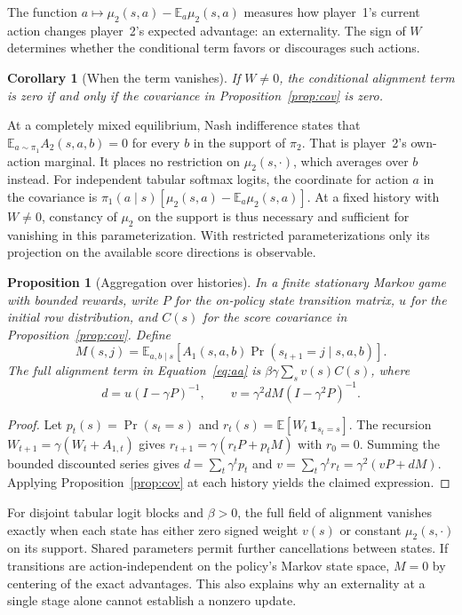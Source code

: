 \documentclass[11pt]{article}
\newtheorem{proposition}{Proposition}
\newtheorem{corollary}{Corollary}
\theoremstyle{remark}
\newcommand{\E}{\mathbb{E}}
\begin{document}
The function $a\mapsto\mu_2(s,a)-\E_a\mu_2(s,a)$ measures how player~1's current action changes player~2's expected advantage: an externality. The sign of $W$ determines whether the conditional term favors or discourages such actions.

\begin{corollary}[When the term vanishes]\label{cor:iff}
If $W\neq 0$, the conditional alignment term is zero if and only if the covariance in Proposition~\ref{prop:cov} is zero.
\end{corollary}

At a completely mixed equilibrium, Nash indifference states that $\E_{a\sim\pi_1}A_2(s,a,b)=0$ for every $b$ in the support of $\pi_2$. That is player~2's own-action marginal. It places no restriction on $\mu_2(s,\cdot)$, which averages over $b$ instead. For independent tabular softmax logits, the coordinate for action $a$ in the covariance is $\pi_1(a\mid s)[\mu_2(s,a)-\E_a\mu_2(s,a)]$. At a fixed history with $W\ne0$, constancy of $\mu_2$ on the support is thus necessary and sufficient for vanishing in this parameterization. With restricted parameterizations only its projection on the available score directions is observable.

\begin{proposition}[Aggregation over histories]\label{prop:aggregate}
In a finite stationary Markov game with bounded rewards, write $P$ for the on-policy state transition matrix, $u$ for the initial row distribution, and $C(s)$ for the score covariance in Proposition~\ref{prop:cov}. Define
\[
 M(s,j)=\E_{a,b\mid s}[A_1(s,a,b)\Pr(s_{t+1}=j\mid s,a,b)] .
\]
The full alignment term in Equation~\eqref{eq:aa} is $\beta\gamma\sum_s v(s)C(s)$, where
\[
 d=u(I-\gamma P)^{-1},\qquad v=\gamma^2 dM(I-\gamma^2P)^{-1}.
\]
\end{proposition}
\begin{proof}
Let $p_t(s)=\Pr(s_t=s)$ and $r_t(s)=\E[W_t\,\mathbf{1}_{s_t=s}]$. The recursion $W_{t+1}=\gamma(W_t+A_{1,t})$ gives $r_{t+1}=\gamma(r_tP+p_tM)$ with $r_0=0$. Summing the bounded discounted series gives $d=\sum_t\gamma^tp_t$ and $v=\sum_t\gamma^tr_t=\gamma^2(vP+dM)$. Applying Proposition~\ref{prop:cov} at each history yields the claimed expression.
\end{proof}
For disjoint tabular logit blocks and $\beta>0$, the full field of alignment vanishes exactly when each state has either zero signed weight $v(s)$ or constant $\mu_2(s,\cdot)$ on its support. Shared parameters permit further cancellations between states. If transitions are action-independent on the policy's Markov state space, $M=0$ by centering of the exact advantages. This also explains why an externality at a single stage alone cannot establish a nonzero update.
\end{document}
